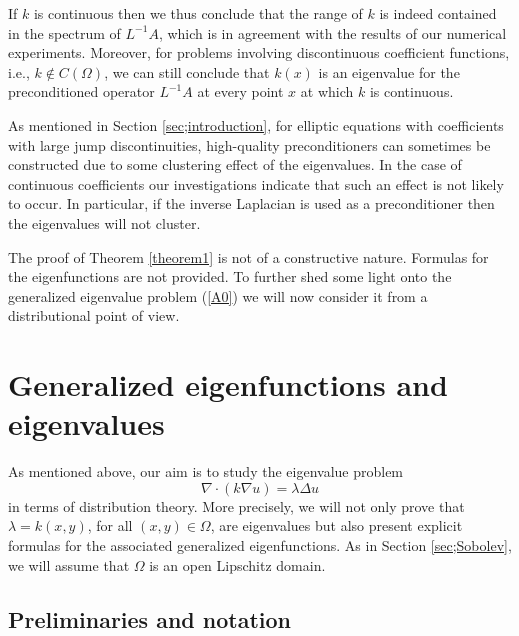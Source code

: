 \documentclass{imanum}
\begin{document}
If $k$ is continuous then we thus conclude that the range of $k$ is indeed
contained in the spectrum of $L^{-1}A$, which is in agreement with the
results of our numerical experiments. Moreover, for
problems involving discontinuous coefficient functions, i.e.,
$k \notin C(\Omega)$, we can still conclude that $k(x)$ is an eigenvalue
for the preconditioned operator $L^{-1}A$ at every point $x$ at which
$k$ is continuous.

As mentioned in Section \ref{sec;introduction}, for elliptic equations
with coefficients with large jump discontinuities, high-quality
preconditioners can sometimes be constructed due to some clustering
effect of the eigenvalues. In the case of continuous coefficients our
investigations indicate that such an effect is not likely to occur. In
particular, if the inverse Laplacian is used as a preconditioner then
the eigenvalues will not cluster.

The proof of Theorem \ref{theorem1} is not of a constructive nature.
Formulas for the eigenfunctions are not provided. To further shed some light
onto the generalized eigenvalue problem (\ref{A0}) we will now consider
it from a distributional point of view.


\section{Generalized eigenfunctions and eigenvalues}
\label{sec;distribution}

As mentioned above, our aim is to study the eigenvalue problem
\begin{equation}
\nabla \cdot (k \nabla u) = \lambda \Delta u
\label{P0}
\end{equation}
in terms of distribution theory. More precisely, we will not only
prove that $\lambda=k(x,y)$, for all $(x,y) \in \Omega$, are
eigenvalues but also present explicit formulas for the associated
generalized eigenfunctions. As in Section \ref{sec;Sobolev}, we will
assume that $\Omega$ is an open Lipschitz domain.


\subsection{Preliminaries and notation}
\label{sec4.1}
\end{document}
